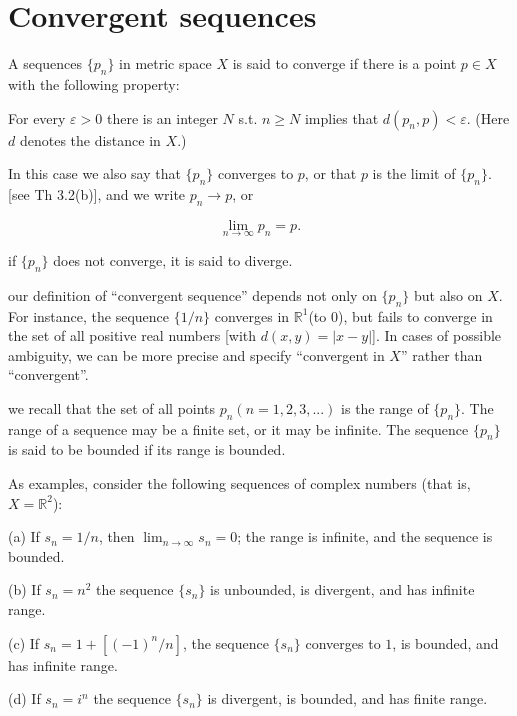 \section{Convergent sequences}

\begin{myDefinition}\label{myDefinition:3.1 converge}
    A sequences 
    $\{p_n\}$ 
    in metric space $X$ is said to converge if there is a point $p \in X$ with the following property:
    
    For every $\varepsilon >0$ there is an integer $N$ s.t. $n \geq N$ implies that $d(p_n, p) < \varepsilon$. (Here $d$ denotes the distance in $X$.)

    In this case we also say that $\{p_n\}$ converges to $p$, or that $p$ is the limit of $\{p_n\}$. [see Th 3.2(b)], and we write $p_n \rightarrow p$, or

    \begin{equation*}
        \lim_{n \to \infty} p_n = p.
    \end{equation*}

    if $\{p_n\}$ does not converge, it is said to diverge.
\end{myDefinition}

our definition of ``convergent sequence'' depends not only on $\{p_n\}$ but also on $X$. For instance, the sequence $\{1/n\}$ converges in $\mathbb{R}^1$(to $0$), but fails to converge in the set of all positive real numbers [with $d(x,y) = |x-y|$]. 
In cases of possible ambiguity, we can be more
precise and specify ``convergent in $X$'' rather than ``convergent''.

we recall that the set of all points $p_n (n=1,2, 3,...)$ is the range of 
$\{p_n\}$.
The range of a sequence may be a finite set, or it may be infinite. The sequence
$\{p_n\}$ is said to be bounded if its range is bounded.

As examples, consider the following sequences of complex numbers
(that is, $X = \mathbb{R}^2$):

(a) If $s_n=1/n$, then $\lim_{n \to \infty} s_n = 0$; the range is infinite, and the sequence is bounded.

(b) If $s_n=n^2$ the sequence $\{s_n\}$ is unbounded, is divergent, and has
infinite range.

(c) If $s_n = 1+[(- 1)^n/n]$, the sequence $\{s_n\}$ converges to $1$, is bounded, and has infinite range.

(d) If $s_n =i^n$ the sequence $\{s_n\}$ is divergent, is bounded, and has finite range.

